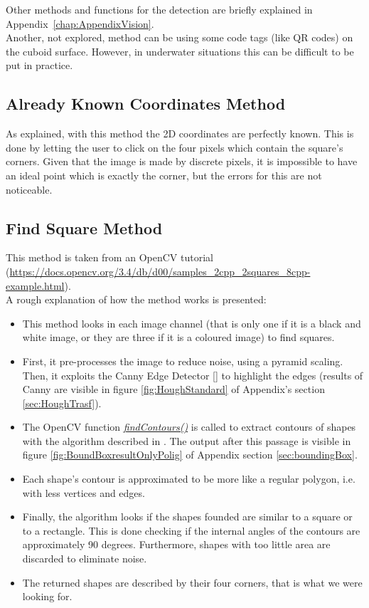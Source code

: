 Other methods and functions for the detection are briefly explained in \mbox{Appendix \ref{chap:AppendixVision}.}\\
Another, not explored, method can be using some code tags (like QR codes) on the cuboid surface. However, in underwater situations this can be difficult to be put in practice.

\subsection{Already Known Coordinates Method}
\label{subsec:clickMethod}
As explained, with this method the 2D coordinates are perfectly known. This is done by letting the user to click on the four pixels which contain the square's corners. Given that the image is made by discrete pixels, it is impossible to have an ideal point which is exactly the corner, but the errors for this are not noticeable.

\subsection{Find Square Method}
\label{subsec:findSquare}
This method is taken from an OpenCV tutorial (\url{https://docs.opencv.org/3.4/db/d00/samples_2cpp_2squares_8cpp-example.html}).\\
A rough explanation of how the method works is presented:
\begin{itemize}
	\item This method looks in each image channel (that is only one if it is a black and white image, or they are three if it is a coloured image) to find squares.
	\item First, it pre-processes the image to reduce noise, using a pyramid scaling. Then, it exploits the Canny Edge Detector [\cite{CannyEdge}] to highlight the edges (results of Canny are visible in figure \ref{fig:HoughStandard} of Appendix's section \ref{sec:HoughTrasf}).
	\item The OpenCV function \href{https://docs.opencv.org/3.4.6/d3/dc0/group__imgproc__shape.html#ga17ed9f5d79ae97bd4c7cf18403e1689a}{\textit{findContours()}} is called to extract contours of shapes with the algorithm described in \cite{findcountors}. The output after this passage is visible in figure \ref{fig:BoundBoxresultOnlyPolig} of Appendix section \ref{sec:boundingBox}.
	\item Each shape's contour is approximated to be more like a regular polygon, i.e. with less vertices and edges.
	\item Finally, the algorithm looks if the shapes founded are similar to a square or to a rectangle. This is done checking if the internal angles of the contours are approximately 90 degrees. Furthermore, shapes with too little area are discarded to eliminate noise.
	
	\item The returned shapes are described by their four corners, that is what we were looking for.

\end{itemize}

